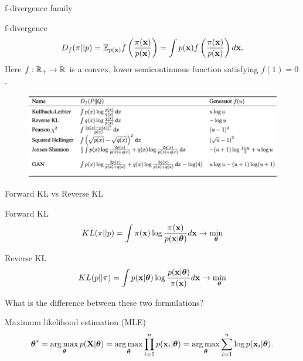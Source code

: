 \begin{frame}{f-divergence family}
	
	\begin{block}{f-divergence}
		\vspace{-0.3cm}
		\[
		D_f(\pi || p) = \mathbb{E}_{p(\mathbf{x})}  f\left( \frac{\pi(\mathbf{x})}{p(\mathbf{x})} \right)  = \int p(\mathbf{x}) f\left( \frac{\pi(\mathbf{x})}{p(\mathbf{x})} \right) d \mathbf{x}.
		\]
		Here $f: \mathbb{R}_+ \rightarrow \mathbb{R}$ is a convex, lower semicontinuous function satisfying $f(1) = 0$.
	\end{block}
	\begin{figure}
		\centering
		\includegraphics[width=\linewidth]{figs/f_divs}
	\end{figure}
\end{frame}
\begin{frame}{Forward KL vs Reverse KL}
	\begin{block}{Forward KL}
		\vspace{-0.2cm}
		\[
		KL(\pi || p) = \int \pi (\mathbf{x}) \log \frac{\pi(\mathbf{x})}{p(\mathbf{x} | \boldsymbol{\theta})} d \mathbf{x} \rightarrow \min_{\boldsymbol{\theta}}
		\]
	\end{block}
	\begin{block}{Reverse KL}
		\vspace{-0.2cm}
		\[
		KL(p || \pi) = \int p (\mathbf{x}| \boldsymbol{\theta}) \log \frac{p(\mathbf{x}| \boldsymbol{\theta})}{\pi(\mathbf{x})} d \mathbf{x} \rightarrow \min_{\boldsymbol{\theta}}
		\]
	\end{block}
	What is the difference between these two formulations?
	
	\begin{block}{Maximum likelihood estimation (MLE)}
		\vspace{-0.5cm}
		\[
		\boldsymbol{\theta}^* = \operatorname*{arg\,max}_{\boldsymbol{\theta}} p(\mathbf{X} | \boldsymbol{\theta}) = \operatorname*{arg\,max}_{\boldsymbol{\theta}} \prod_{i=1}^n p(\mathbf{x}_i | \boldsymbol{\theta}) = \operatorname*{arg\,max}_{\boldsymbol{\theta}} \sum_{i=1}^n \log p(\mathbf{x}_i | \boldsymbol{\theta}).
		\]
		\vspace{-0.1cm}
	\end{block}
\end{frame}
